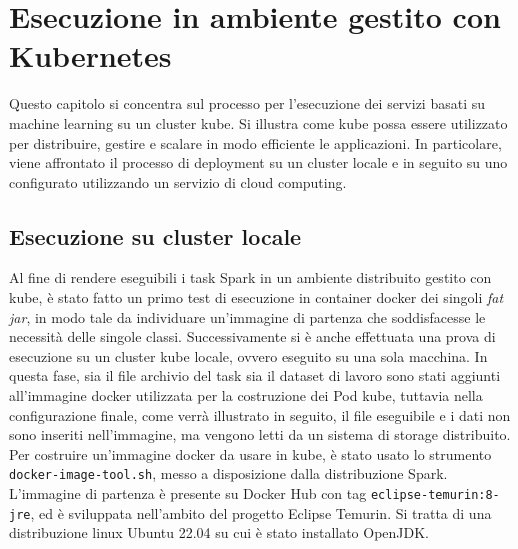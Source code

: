 \documentclass[12pt,a4paper,fleqn,titlepage]{report}
\begin{document}
\chapter{Esecuzione in ambiente gestito con Kubernetes}\label{ch:rec}
    Questo capitolo si concentra sul processo per l'esecuzione dei servizi basati su machine learning su un \gls{cluster} \gls{kube}. Si illustra come \gls{kube} possa essere utilizzato per distribuire, gestire e scalare in modo efficiente le applicazioni. In particolare, viene affrontato il processo di deployment su un \gls{cluster} locale e in seguito su uno configurato utilizzando un servizio di cloud computing.

    \section{Esecuzione su cluster locale}
        Al fine di rendere eseguibili i task Spark in un ambiente distribuito gestito con \gls{kube}, è stato fatto un primo test di esecuzione in \gls{container} \gls{docker} dei singoli \emph{fat jar}, in modo tale da individuare un'immagine di partenza che soddisfacesse le necessità delle singole classi. Successivamente si è anche effettuata una prova di esecuzione su un cluster \gls{kube} locale, ovvero eseguito su una sola macchina. In questa fase, sia il file archivio del task sia il dataset di lavoro sono stati aggiunti all'immagine \gls{docker} utilizzata per la costruzione dei Pod \gls{kube}, tuttavia nella configurazione finale, come verrà illustrato in seguito, il file eseguibile e i dati non sono inseriti nell'immagine, ma vengono letti da un sistema di storage distribuito. Per costruire un'immagine \gls{docker} da usare in \gls{kube}, è stato usato lo strumento \lstinline{docker-image-tool.sh}, messo a disposizione dalla distribuzione Spark.
        L'immagine di partenza è presente su Docker Hub con tag \lstinline{eclipse-temurin:8-jre}, ed è sviluppata nell'ambito del progetto Eclipse Temurin. Si tratta di una distribuzione linux Ubuntu 22.04 su cui è stato installato OpenJDK.
\end{document}
